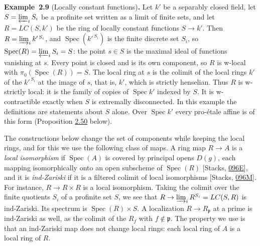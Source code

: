 \documentclass[11pt]{article}
\newenvironment{bpstatement}[2]{\par\addvspace{0.6\baselineskip}\noindent\textbf{#1}#2\textbf{.}\enspace\ignorespaces}
  {\par\addvspace{0.4\baselineskip}}
\begin{document}
\label{bp26}%
\begin{bpstatement}{Example~2.9}{ (Locally constant functions)}
Let \(k'\) be a separably closed field, let \(S=\varprojlim_iS_i\) be a profinite set written as a limit of finite sets, and let \(R=LC(S,k')\) be the ring of locally constant functions \(S\to k'\). Then \(R=\varinjlim_ik'^{\,S_i}\), and \(\operatorname{Spec}(k'^{\,S_i})\) is the finite discrete set \(S_i\), so \(\operatorname{Spec}(R)=\varprojlim_iS_i=S\): the point \(s\in S\) is the maximal ideal of functions vanishing at \(s\). Every point is closed and is its own component, so \(R\) is w-local with \(\pi_0(\operatorname{Spec}(R))=S\). The local ring at \(s\) is the colimit of the local rings \(k'\) of the \(k'^{\,S_i}\) at the image of \(s\), that is, \(k'\), which is strictly henselian. Thus \(R\) is w-strictly local: it is the family of copies of \(\operatorname{Spec}k'\) indexed by \(S\). It is w-contractible exactly when \(S\) is extremally disconnected. In this example the definitions are statements about \(S\) alone. Over \(\operatorname{Spec}k'\) every pro-étale affine is of this form (Proposition \hyperref[bp151]{2.50} below).
\end{bpstatement}

\label{bp27}%
The constructions below change the set of components while keeping the local rings, and for this we use the following class of maps. A ring map \(R\to A\) is a \emph{local isomorphism} if \(\operatorname{Spec}(A)\) is covered by principal opens \(D(g)\), each mapping isomorphically onto an open subscheme of \(\operatorname{Spec}(R)\) [Stacks, \href{https://stacks.math.columbia.edu/tag/096E}{096E}], and it is \emph{ind-Zariski} if it is a filtered colimit of local isomorphisms [Stacks, \href{https://stacks.math.columbia.edu/tag/096M}{096M}]. For instance, \(R\to R\times R\) is a local isomorphism. Taking the colimit over the finite quotients \(S_i\) of a profinite set \(S\), we see that \(R\to\varinjlim_iR^{S_i}=LC(S,R)\) is ind-Zariski. Its spectrum is \(\operatorname{Spec}(R)\times S\). A localization \(R\to R_{\mathfrak p}\) at a prime is ind-Zariski as well, as the colimit of the \(R_f\) with \(f\notin\mathfrak p\). The property we use is that an ind-Zariski map does not change local rings: each local ring of \(A\) is a local ring of \(R\).
\end{document}
